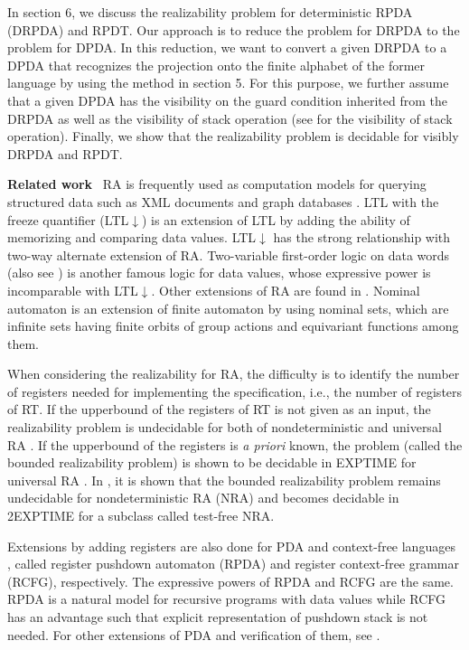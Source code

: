 In section 6, we discuss the realizability problem for deterministic RPDA (DRPDA) and RPDT.
Our approach is to reduce the problem for DRPDA to the problem for DPDA.
In this reduction, we want to convert a given DRPDA to a DPDA that recognizes
the projection onto the finite alphabet of the former language by using the method
in section 5.
For this purpose, we further assume that a given DPDA has the visibility
on the guard condition inherited from the DRPDA as well as the visibility
of stack operation (see \cite{AM04} for the visibility of stack operation).
Finally, we show that the realizability problem is decidable for visibly DRPDA and RPDT.
\medskip\par\noindent
{\bf Related work}~
RA is frequently used as
computation models for querying structured data such as XML documents
and graph databases \cite{LV12,LTV15}.
LTL with the freeze quantifier (LTL$\downarrow$) \cite{DL09,DLN07} is
an extension of LTL by adding the ability of memorizing and comparing data values.
LTL$\downarrow$ has the strong relationship with two-way alternate extension of RA.
Two-variable first-order logic on data words \cite{BDMSS11}(also see \cite{Bo02})
is another famous logic for data values,
whose expressive power is incomparable with LTL$\downarrow$.
Other extensions of RA are found in \cite{BKL14,CLTW17,DFSS19,BCGK12}.
Nominal automaton \cite{BKL14} is an extension of finite automaton
by using nominal sets, which are infinite sets having finite orbits
of group actions and equivariant functions among them.

When considering the realizability for RA,
the difficulty is to identify the number of registers
needed for implementing the specification, i.e., the number of registers of RT.
If the upperbound of the registers of RT is not given as an input,
the realizability problem is undecidable for both of nondeterministic and
universal RA \cite{EFR19}.
If the upperbound of the registers is {\em a priori} known,
the problem (called the bounded realizability
problem) is shown to be decidable in EXPTIME for universal RA \cite{KK19}.
In \cite{EFR19}, it is shown that the bounded realizability problem remains undecidable
for nondeterministic RA (NRA) \cite{EFR19}
and becomes decidable in 2EXPTIME for a subclass called test-free NRA.

Extensions by adding registers are also done for PDA \cite{CL15,MRT17,STS21} and
context-free languages \cite{CK98,STS18,STS19},
called register pushdown automaton (RPDA) and register context-free grammar (RCFG), respectively.
The expressive powers of RPDA and RCFG are the same.
RPDA is a natural model for recursive programs with data values while
RCFG has an advantage such that explicit representation of pushdown stack is not needed.
For other extensions of PDA and verification of them, see \cite{ST12,XO13,RBB10}.
